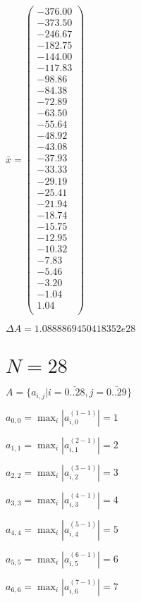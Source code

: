 \documentclass[a4paper,12pt]{article}
\begin{document}
$\bar { x } = \begin{pmatrix}
-376.00 \\
-373.50 \\
-246.67 \\
-182.75 \\
-144.00 \\
-117.83 \\
-98.86 \\
-84.38 \\
-72.89 \\
-63.50 \\
-55.64 \\
-48.92 \\
-43.08 \\
-37.93 \\
-33.33 \\
-29.19 \\
-25.41 \\
-21.94 \\
-18.74 \\
-15.75 \\
-12.95 \\
-10.32 \\
-7.83 \\
-5.46 \\
-3.20 \\
-1.04 \\
1.04 \\
\end{pmatrix}
$

$\Delta A = 1.0888869450418352e28$



\section{ $N = 28$ }
$A = \{ a _{ i, j } | i = \bar { 0..28 }, j = \bar { 0..29 } \}$

$a _{ 0, 0 } =  \max _i |a _{ i, 0 } ^{ (1 - 1) } | = 1$

$a _{ 1, 1 } =  \max _i |a _{ i, 1 } ^{ (2 - 1) } | = 2$

$a _{ 2, 2 } =  \max _i |a _{ i, 2 } ^{ (3 - 1) } | = 3$

$a _{ 3, 3 } =  \max _i |a _{ i, 3 } ^{ (4 - 1) } | = 4$

$a _{ 4, 4 } =  \max _i |a _{ i, 4 } ^{ (5 - 1) } | = 5$

$a _{ 5, 5 } =  \max _i |a _{ i, 5 } ^{ (6 - 1) } | = 6$

$a _{ 6, 6 } =  \max _i |a _{ i, 6 } ^{ (7 - 1) } | = 7$
\end{document}
